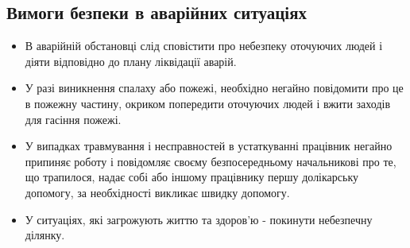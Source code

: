 \subsection{Вимоги безпеки в аварійних ситуаціях}
\begin{itemize}
  \item В аварійній обстановці слід сповістити про небезпеку оточуючих людей
    і діяти відповідно до плану ліквідації аварій.
  \item У разі виникнення спалаху або пожежі, необхідно негайно повідомити
    про це в пожежну частину, окриком попередити оточуючих людей і вжити
    заходів для гасіння пожежі.
  \item У випадках травмування і несправностей в устаткуванні працівник негайно
    припиняє роботу і повідомляє своєму безпосередньому начальникові про те,
    що трапилося, надає собі або іншому працівнику першу долікарську допомогу,
    за необхідності викликає швидку допомогу.
  \item У ситуаціях, які загрожують життю та здоров'ю - покинути небезпечну ділянку.
\end{itemize}